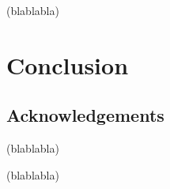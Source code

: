 \documentclass[11pt]{book}
\begin{document}
(blablabla)

\chapter*{Conclusion} \label{chp:conclusion}


\newpage
\vspace*{100pt}
\thispagestyle{empty}
\section*{Acknowledgements}

(blablabla)


(blablabla) 


\nocite{*}







\backmatter

\printindex

\end{document}
